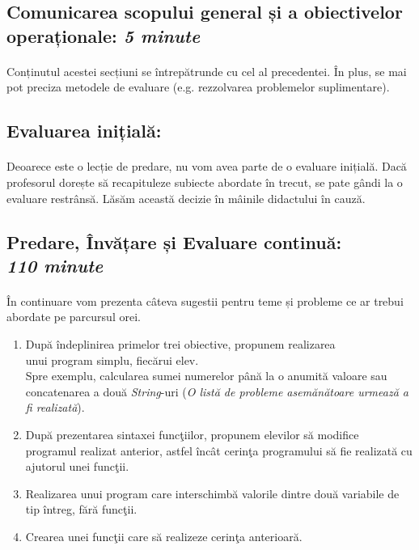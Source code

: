 \documentclass{article}
\newcommand{\itl}{\textit}
\begin{document}
	\subsection{Comunicarea scopului general și a obiectivelor operaționale: \itl{5 minute}}
		\paragraph{}Conținutul acestei secțiuni se întrepătrunde cu cel al precedentei. În plus, se mai pot preciza metodele de evaluare (e.g. rezzolvarea problemelor suplimentare). 	
	
	\subsection{Evaluarea inițială:}
		\paragraph{} Deoarece este o lecție de predare, nu vom avea parte de o evaluare inițială. Dacă profesorul  dorește să recapituleze subiecte abordate în trecut, se pate gândi la o evaluare restrânsă. Lăsăm această decizie în mâinile didactului în cauză.
	
	\subsection{Predare, Învățare și Evaluare continuă:\\ \itl{110 minute}}
	\paragraph{} În continuare vom prezenta câteva sugestii pentru teme și probleme ce ar trebui abordate pe parcursul orei.	
	\begin{enumerate}

		\item Dup\u a \^ indeplinirea primelor trei obiective, propunem realizarea\\ unui program simplu, fiec\u arui elev.\\ Spre exemplu, calcularea sumei numerelor p\^ an\u a la o anumit\u a valoare sau concatenarea a dou\u a \textit{String}-uri (\textit{O list\u a de probleme asem\u an\u atoare urmeaz\u a a fi realizat\u a}).

		\item Dup\u a prezentarea sintaxei func\c tiilor, propunem elevilor s\u a modifice \\programul realizat anterior, astfel \^ inc\^ at cerin\c ta programului s\u a fie realizat\u a cu ajutorul unei func\c tii.

		\item Realizarea unui program care interschimb\u a valorile dintre dou\u a variabile de tip \^ intreg, f\u ar\u a func\c tii.

		\item Crearea unei func\c tii care s\u a realizeze cerin\c ta anterioar\u a.

\end{enumerate}
\end{document}
